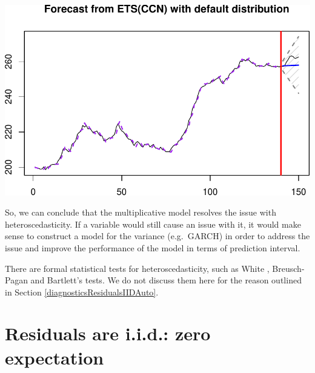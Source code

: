\documentclass[
]{book}
\theoremstyle{definition}
\theoremstyle{definition}
\theoremstyle{definition}
\theoremstyle{definition}
\theoremstyle{remark}
\begin{document}
\includegraphics{adam_files/figure-latex/unnamed-chunk-159-1.pdf}

So, we can conclude that the multiplicative model resolves the issue with heteroscedasticity. If a variable would still cause an issue with it, it would make sense to construct a model for the variance (e.g.~GARCH) in order to address the issue and improve the performance of the model in terms of prediction interval.

There are formal statistical tests for heteroscedasticity, such as White \citep{WikipediaWhite2021}, Breusch-Pagan \citep{WikipediaBreuschPagan2021} and Bartlett's \citep{WikipediaBartlett2021} tests. We do not discuss them here for the reason outlined in Section \ref{diagnosticsResidualsIIDAuto}.

\hypertarget{diagnosticsResidualsIIDExpectation}{%
\section{Residuals are i.i.d.: zero expectation}\label{diagnosticsResidualsIIDExpectation}}
\end{document}
